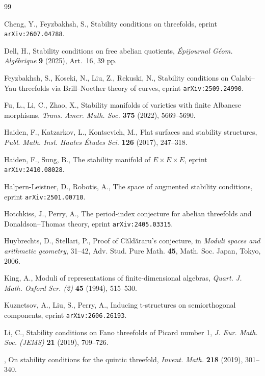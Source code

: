 \documentclass[11pt, reqno]{amsart}
\numberwithin{equation}{section}
\theoremstyle{plain}
\theoremstyle{remark}
\theoremstyle{definition}
\theoremstyle{italicsname}
\begin{document}
\begin{thebibliography}{99}

Cheng, Y., Feyzbakhsh, S., Stability conditions on threefolds, eprint {\tt arXiv:2607.04788}.

Dell, H., Stability conditions on free abelian quotients, {\it \'Epijournal G\'eom. Alg\'ebrique} {\bf 9} (2025), Art.~16, 39 pp.

Feyzbakhsh, S., Koseki, N., Liu, Z., Rekuski, N., Stability conditions on Calabi--Yau threefolds via Brill--Noether theory of curves, eprint {\tt arXiv:2509.24990}.

Fu, L., Li, C., Zhao, X., Stability manifolds of varieties with finite {A}lbanese morphisms, {\it Trans. Amer. Math. Soc.} {\bf 375} (2022), 5669--5690.

Haiden, F., Katzarkov, L., Kontsevich, M., Flat surfaces and stability structures, {\it Publ. Math. Inst. Hautes \'Etudes Sci.} {\bf 126} (2017), 247--318.

Haiden, F., Sung, B., The stability manifold of $E\times E \times E$, eprint {\tt arXiv:2410.08028}.

Halpern-Leistner, D., Robotis, A., The space of augmented stability conditions, eprint {\tt arXiv:2501.00710}.

Hotchkiss, J., Perry, A., The period-index conjecture for abelian threefolds and Donaldson--Thomas theory, eprint {\tt arXiv:2405.03315}.

Huybrechts, D., Stellari, P., Proof of C\u{a}ld\u{a}raru's conjecture, in {\it Moduli spaces and arithmetic geometry}, 31--42, Adv. Stud. Pure Math. {\bf 45}, Math. Soc. Japan, Tokyo, 2006.

King, A., Moduli of representations of finite-dimensional algebras, {\it Quart. J. Math. Oxford Ser. (2)} {\bf 45} (1994), 515--530.

Kuznetsov, A., Liu, S., Perry, A., Inducing t-structures on semiorthogonal components, eprint {\tt arXiv:2606.26193}.

Li, C., Stability conditions on Fano threefolds of Picard number 1, {\it J. Eur. Math. Soc. (JEMS)} {\bf 21} (2019), 709--726.

\bysame, On stability conditions for the quintic threefold, {\it Invent. Math.} {\bf 218} (2019), 301--340.


\end{thebibliography}
\end{document}
